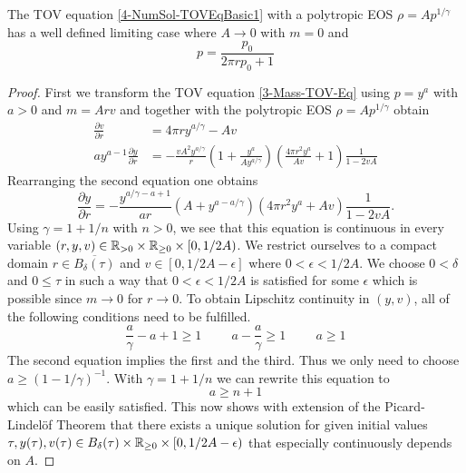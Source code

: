 \begin{theorem}
	The TOV equation \ref{4-NumSol-TOVEqBasic1} with a polytropic EOS $\rho=Ap^{1/\gamma}$ has a well defined limiting case where $A\rightarrow0$ with $m=0$ and
	\begin{equation}
		p = \frac{p_0}{2\pi rp_0+1}
	\end{equation}
\end{theorem}
\begin{proof}
	First we transform the TOV equation \ref{3-Mass-TOV-Eq} using $p=y^a$ with $a>0$ and $m=Arv$ and together with the polytropic EOS $\rho=Ap^{1/\gamma}$ obtain
	\begin{align}
		\frac{\partial v}{\partial r} &= 4\pi ry^{a/\gamma}-Av\\
		ay^{a-1}\frac{\partial y}{\partial r} &= -\frac{vA^2y^{a/\gamma}}{r}\left(1+\frac{y^a}{Ay^{a/\gamma}}\right)\left(\frac{4\pi r^2y^a}{Av} +1\right)\frac{1}{1-2vA}
		\label{tmp-label-2}
	\end{align}
	Rearranging the second equation one obtains
	\begin{equation}
		\frac{\partial y}{\partial r} = -\frac{y^{a/\gamma-a+1}}{ar}\left(A+y^{a-a/\gamma}\right)\left(4\pi r^2y^a +Av\right)\frac{1}{1-2vA}.
	\end{equation}
	Using $\gamma=1+1/n$ with $n>0$, we see that this equation is continuous in every variable $(r,y,v)\in\mathbb{R}_{>0}\times\mathbb{R}_{\geq0}\times[0,1/2A)$. We restrict 
	ourselves to a compact domain $r\in \overline{B_{\delta}(\tau)}$ and $v\in[0,1/2A-\epsilon]$ where $0<\epsilon<1/2A$. 
	We choose $0<\delta$ and $0\leq\tau$ in such a way that $0<\epsilon<1/2A$ is satisfied for some $\epsilon$ which is possible since $m\rightarrow0$ for $r\rightarrow0$.
	To obtain Lipschitz continuity in $(y,v)$, all of the following conditions need to be fulfilled.
	\begin{equation}
		\frac{a}{\gamma}-a+1 \geq 1 \hspace{1cm} a-\frac{a}{\gamma} \geq 1 \hspace{1cm} a \geq 1
		\label{tmp-label-1}
	\end{equation}
	The second equation implies the first and the third. Thus we only need to choose $a\geq(1-1/\gamma)^{-1}$. With $\gamma=1+1/n$ we can rewrite this equation to 
	\begin{equation}
		a\geq n+1
	\end{equation}
	which can be easily satisfied. 
	This now shows with extension of the Picard-Lindelöf Theorem that there exists a unique solution for given initial values $\tau, y(\tau), v(\tau)\in B_{\delta}(\tau)\times\mathbb{R}_{\geq0}\times[0,1/2A-\epsilon)$ that especially continuously depends on $A$.

\end{proof}
